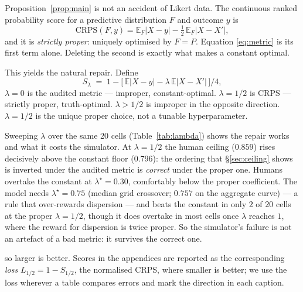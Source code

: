 \documentclass[11pt]{article}
\begin{document}
Proposition~\ref{prop:main} is not an accident of Likert data. The continuous
ranked probability score for a predictive distribution $F$ and outcome $y$ is
\[
\mathrm{CRPS}(F,y)=\mathbb{E}_F|X-y|-\tfrac{1}{2}\,\mathbb{E}_F|X-X'| ,
\]
and it is \emph{strictly proper}: uniquely optimised by $F=P$. Equation
\eqref{eq:metric} is its first term alone. Deleting the second is exactly what
makes a constant optimal.

This yields the natural repair. Define
\begin{equation}
S_\lambda \;=\; 1-\big[\,\mathbb{E}|X-y|-\lambda\,\mathbb{E}|X-X'|\,\big]/4 ,
\label{eq:slambda}
\end{equation}
$\lambda{=}0$ is the audited metric --- improper, constant-optimal. $\lambda{=}1/2$
is CRPS --- strictly proper, truth-optimal. $\lambda{>}1/2$ is improper in the
opposite direction. $\lambda{=}1/2$ is the unique proper choice, not a tunable
hyperparameter.

Sweeping $\lambda$ over the same 20 cells (Table~\ref{tab:lambda}) shows the
repair works and what it costs the simulator. At $\lambda{=}1/2$ the human
ceiling ($0.859$) rises decisively above the constant floor ($0.796$): the
ordering that \S\ref{sec:ceiling} shows is inverted under the audited metric is
\emph{correct} under the proper one. Humans overtake the constant at
$\lambda^\star{=}0.30$, comfortably below the proper coefficient. The model needs
$\lambda^\star{=}0.75$ (median grid crossover; $0.757$ on the aggregate
curve) --- a rule that over-rewards dispersion --- and beats the
constant in only $2$ of $20$ cells at the proper $\lambda{=}1/2$, though it does
overtake in most cells once $\lambda$ reaches $1$, where the reward for
dispersion is twice proper. So the simulator's
failure is not an artefact of a bad metric: it survives the correct one.

so larger is better. Scores in the appendices are reported as the
corresponding \emph{loss} $L_{1/2}=1-S_{1/2}$, the normalised CRPS, where
smaller is better; we use the loss wherever a table compares errors and mark
the direction in each caption.
\end{document}
